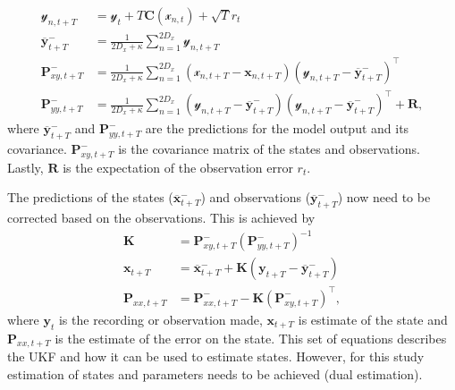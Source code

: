 \begin{align}
\mathbf{\mathcal{y}}_{n,t+T} &= \mathbf{\mathcal{y}}_{t} + T\mathbf{C}(\mathbf{\mathcal{x}}_{n,t})+ \sqrt{T}{r}_{t}\\
\overline{\mathbf{y}}_{t+T}^{-} &= \frac{1}{2D_{x}+\kappa}\sum_{n=1}^{2D_{x}} \mathbf{\mathcal{y}}_{n,t+T}\\
\label{eqn: statecovg}
\mathbf{P}_{xy,t+T}^{-} &= \frac{1}{2D_{x}+\kappa}\sum_{n=1}^{2D_{x}} (\mathbf{\mathcal{x}}_{n,t+T}-\mathbf{x}_{n,t+T}) (\mathbf{\mathcal{y}}_{n,t+T}-\overline{\mathbf{y}}_{t+T}^{-})^{\top}\\
\mathbf{P}_{yy,t+T}^{-} &= \frac{1}{2D_{x}+\kappa}\sum_{n=1}^{2D_{x}} (\mathbf{\mathcal{y}}_{n,t+T}-\overline{\mathbf{y}}_{t+T}^{-}) (\mathbf{\mathcal{y}}_{n,t+T}-\overline{\mathbf{y}}_{t+T}^{-})^{\top} +\mathbf{R},
\end{align} where $\overline{\mathbf{y}}_{t+T}^{-}$ and $\mathbf{P}_{yy,t+T}^{-}$ are the predictions for the model output and its covariance. $\mathbf{P}_{xy,t+T}^{-}$ is the covariance matrix of the states and observations. Lastly, $\mathbf{R}$ is the expectation of the observation error $r_{t}$.

The predictions of the states ($\overline{\mathbf{x}}_{t+T}^{-}$) and observations ($\overline{\mathbf{y}}_{t+T}^{-}$) now need to be corrected based on the observations. This is achieved by \begin{align}
\mathbf{K} &= \mathbf{P}_{xy,t+T}^{-}(\mathbf{P}_{yy,t+T}^{-})^{-1}\\
\mathbf{x}_{t+T} &= \overline{\mathbf{x}}_{t+T}^{-} + \mathbf{K}(\mathbf{y}_{t+T}-\overline{\mathbf{y}}_{t+T}^{-})\\
\mathbf{P}_{xx,t+T} &= \mathbf{P}_{xx,t+T}^{-} - \mathbf{K}(\mathbf{P}_{xy,t+T}^{-})^{\top},
\end{align} where $\mathbf{y}_{t}$ is the recording or observation made, $\mathbf{x}_{t+T}$ is estimate of the state and $\mathbf{P}_{xx,t+T}$ is the estimate of the error on the state. This set of equations describes the UKF and how it can be used to estimate states. However, for this study estimation of states and parameters needs to be achieved (dual estimation).

